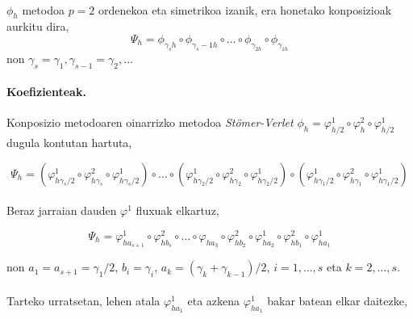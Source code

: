 \paragraph*{}$\phi_h$ metodoa $p=2$ ordenekoa eta simetrikoa izanik, era honetako konposizioak aurkitu dira,
\begin{equation}
\Psi_h=\phi_{\gamma_s h} \circ \phi_{\gamma_s-1 h} \circ \dots \circ \phi_{\gamma_{2 h}} \circ \phi_{\gamma_{1 h}} 
\end{equation}
non $\gamma_s=\gamma_1, \gamma_{s-1}=\gamma_2,\dots$ 


\paragraph*{\textbf{Koefizienteak}.}

Konposizio metodoaren oinarrizko metodoa \emph{Stömer-Verlet}  $\phi_h=\varphi_{h/2}^{1} \circ \varphi_{h}^{2} \circ \varphi_{h/2}^{1}$  dugula kontutan hartuta,

\begin{equation*}
\Psi_h=(\varphi_{h \gamma_s/2}^{1} \circ \varphi_{h \gamma_s}^{2} \circ \varphi_{h \gamma_s/2}^{1}) \circ \dots 
       \circ
       (\varphi_{h \gamma_2/2}^{1} \circ \varphi_{h \gamma_2}^{2} \circ \varphi_{h \gamma_2/2}^{1}) 
       \circ
       (\varphi_{h \gamma_1/2}^{1} \circ \varphi_{h \gamma_1}^{2} \circ \varphi_{h \gamma_1/2}^{1})  
\end{equation*}

\paragraph*{}Beraz jarraian dauden $\varphi^1$ fluxuak elkartuz,

\begin{equation*}
\Psi_h=\varphi_{h a_{s+1}}^{1} \circ \varphi_{h b_s}^{2} \circ \dots 
       \circ
       \varphi_{h a_3} \circ \varphi_{h b_2}^{2} 
       \circ
       \varphi_{h a_2}^{1} \circ \varphi_{h b_1}^{2} \circ \varphi_{h a_1}^{1}  
\end{equation*}

non $a_1=a_{s+1}=\gamma_1/2$, $b_i=\gamma_i$, $a_k=(\gamma_k+\gamma_{k-1})/2$, $i=1,\dots,s$ eta $k=2,\dots,s$.

\paragraph*{}Tarteko urratsetan, lehen atala $\varphi_{h a_1}^{1}$ eta azkena $\varphi_{h a_1}^{1}$ bakar batean elkar daitezke, 

